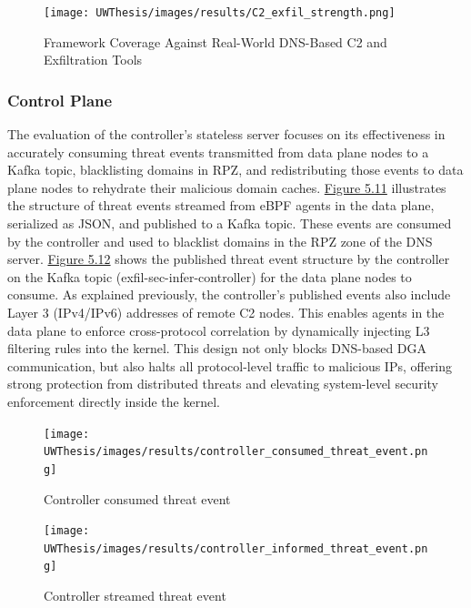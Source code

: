\documentclass [11pt, proquest] {uwthesis}[2020/02/24]
\begin{document}
\newpage
\begin{figure}[H]
  \texttt{[image: UWThesis/images/results/C2\_exfil\_strength.png]}
  \caption{Framework Coverage Against Real-World DNS-Based C2 and Exfiltration Tools}
\label{tab:dns-framework-coverage}
\end{figure}

\subsubsection{Control Plane}
The evaluation of the controller’s stateless server focuses on its effectiveness in accurately consuming threat events transmitted from data plane nodes to a Kafka topic, blacklisting domains in RPZ, and redistributing those events to data plane nodes to rehydrate their malicious domain caches. \hyperref[fig:controller_metric]{Figure 5.11} illustrates the structure of threat events streamed from eBPF agents in the data plane, serialized as JSON, and published to a Kafka topic. These events are consumed by the controller and used to blacklist domains in the RPZ zone of the DNS server. \hyperref[fig:controller_aware_metric]{Figure 5.12} shows the published threat event structure by the controller on the Kafka topic (exfil-sec-infer-controller) for the data plane nodes to consume. As explained previously, the controller’s published events also include Layer 3 (IPv4/IPv6) addresses of remote C2 nodes. This enables agents in the data plane to enforce cross-protocol correlation by dynamically injecting L3 filtering rules into the kernel. This design not only blocks DNS-based DGA communication, but also halts all protocol-level traffic to malicious IPs, offering strong protection from distributed threats and elevating system-level security enforcement directly inside the kernel.


\begin{figure}[H]
  \centering
  \begin{minipage}[t]{0.47\textwidth}
    \centering
    \texttt{[image: UWThesis/images/results/controller\_consumed\_threat\_event.png]}
\caption{Controller consumed threat event}
  \label{fig:controller_metric}
  \end{minipage}
  \hfill
  \begin{minipage}[t]{0.47\textwidth}
    \centering
    \texttt{[image: UWThesis/images/results/controller\_informed\_threat\_event.png]}
    \caption{Controller streamed threat event}
     \label{fig:controller_aware_metric}
  \end{minipage}
\end{figure}
\end{document}
